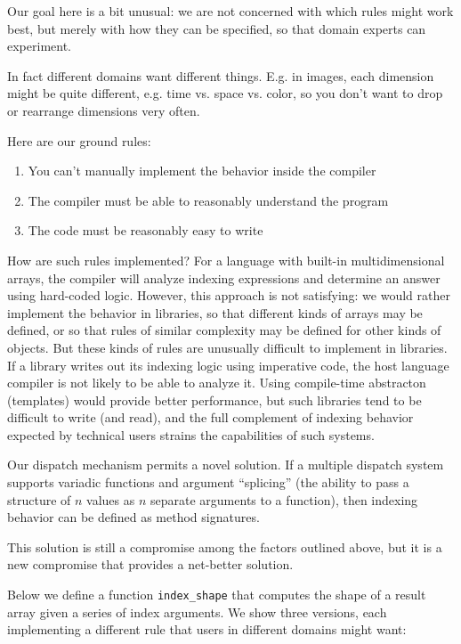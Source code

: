 Our goal here is a bit unusual: we are not concerned with which rules
might work best, but merely with how they can be specified, so that
domain experts can experiment.

In fact different domains want different things. E.g. in images, each
dimension might be quite different, e.g. time vs. space vs. color,
so you don't want to drop or rearrange dimensions very often.

Here are our ground rules:

\begin{enumerate}
\item You can't manually implement the behavior inside the compiler
\item The compiler must be able to reasonably understand the program
\item The code must be reasonably easy to write
\end{enumerate}


How are such rules implemented? For a
language with built-in multidimensional arrays, the compiler will
analyze indexing expressions and determine an answer using hard-coded
logic.
However, this approach is not satisfying: we would rather
implement the behavior in libraries, so that different kinds of arrays
may be defined, or so that rules of similar complexity may be
defined for other kinds of objects. But these kinds of rules are
unusually difficult to implement in libraries. If a library writes out
its indexing logic using imperative code, the host language compiler
is not likely to be able to analyze it. Using compile-time abstracton
(templates) would provide better performance, but such libraries tend
to be difficult to write (and read), and the full complement of
indexing behavior expected by technical users strains the capabilities
of such systems.


Our dispatch mechanism permits a novel solution. If a multiple dispatch
system supports variadic functions and argument ``splicing'' (the ability
to pass a structure of $n$ values as $n$ separate arguments to a function),
then indexing behavior can be defined as method signatures.

This solution is still a compromise among the factors outlined above,
but it is a new compromise that provides a net-better solution.

Below we define a function \texttt{index\_shape} that computes the
shape of a result array given a series of index arguments. We show
three versions, each implementing a different rule that users in
different domains might want:

